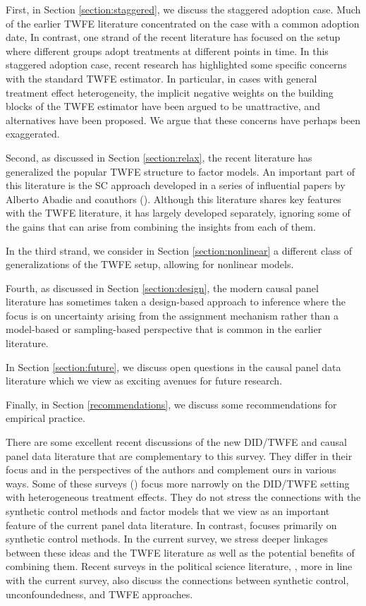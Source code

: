\documentclass[letterpaper,12pt,leqno]{article}
\begin{document}
First,  in Section \ref{section:staggered}, we discuss the staggered adoption case. 
Much of the earlier TWFE literature concentrated on the case with a common adoption date, 
In contrast, one strand of the recent literature has focused on the setup where different groups adopt treatments at different points in time. In this staggered adoption case, recent research has highlighted some specific concerns with the standard TWFE estimator. In particular, in cases with general treatment effect heterogeneity, the implicit negative weights on the building blocks of the TWFE estimator have been argued to be unattractive, and alternatives have been proposed. We argue that these concerns have perhaps been exaggerated.

Second, as discussed in  Section \ref{section:relax}, the recent literature has generalized the popular TWFE structure to factor models. An important part of this literature is the SC approach developed in a series of influential papers by Alberto Abadie and coauthors (\citealp*{abadie2003, abadie2010synthetic}). Although this literature shares key features with the TWFE literature, it has largely developed separately, ignoring some of the gains that can arise from combining the insights from each of them. 

In the third strand, we consider in Section \ref{section:nonlinear} a different class of generalizations of the TWFE setup,  allowing for nonlinear models.

 Fourth, as discussed in Section \ref{section:design}, the modern causal panel literature has sometimes taken a design-based approach to inference where the focus is on uncertainty arising from the assignment mechanism rather than a model-based or sampling-based perspective that is common in the earlier literature. 

In Section \ref{section:future}, we discuss open questions in the causal panel data literature which we view as exciting avenues for future research.

Finally, in Section \ref{recommendations}, we discuss some recommendations for empirical practice.
 
 There are some excellent recent discussions of the new DID/TWFE and causal panel data literature that are complementary to this survey. They differ in their focus and in the perspectives of the authors and complement ours in various ways.
  Some of these surveys (\citealp{de2023two, roth2023s}) focus more narrowly on the DID/TWFE setting with heterogeneous treatment effects. They do not stress the connections with the synthetic control methods and factor models that we view as an important feature of the current panel data literature. In contrast, \citep{abadie2019using} focuses primarily on synthetic control methods. In the current survey, we stress deeper linkages between these ideas and the TWFE literature  as well as the potential benefits of combining them. Recent surveys in the political science literature, \citep{liu2022practical, xu2023causal}, more in line with the current survey, also discuss the connections between synthetic control, unconfoundedness, and TWFE approaches.
\end{document}
